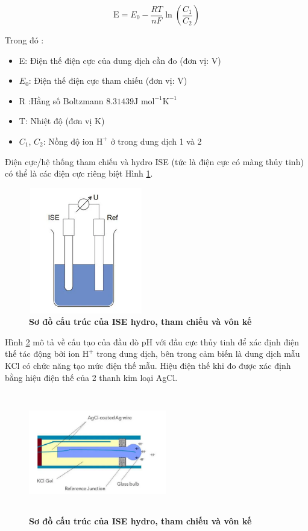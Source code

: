\documentclass{article} %
\begin{document}
	\begin{equation}
		\mathrm{E}=E_0-\frac{R T}{n F} \ln \left(\frac{C_1}{C_2}\right)     
	\end{equation}
	
	
	Trong đó :
	\begin{itemize}
		\item E: Điện thế điện cực của dung dịch cần đo (đơn vị: V)
		\item $E_0$: Điện thế điện cực tham chiếu (đơn vị: V)
		\item R :Hằng số Boltzmann $8.31439 \text{J mol}^{-1} \text{K}^{-1}$
		\item T: Nhiệt độ (đơn vị K)
		\item $C_1$, $C_2$: Nồng độ ion \( \text{H}^+ \) ở trong dung dịch 1 và 2
	\end{itemize}

Điện cực/hệ thống tham chiếu và hydro ISE (tức là điện cực có màng thủy tinh) có thể là các điện cực riêng biệt Hình \ref{ISE}.	

	\begin{figure}[!ht]
		\centering
		\includegraphics[width=5cm,height=5.5cm]{Images/ISE.png}
		\caption[Sơ đồ cấu trúc của ISE hydro, tham chiếu và vôn kế \cite{HeadPH}]{\bfseries \fontsize{12pt}{0pt}\selectfont Sơ đồ cấu trúc của ISE hydro, tham chiếu và vôn kế \cite{HeadPH}}
		\label{ISE}
	\end{figure}
	
	Hình \ref{PH} mô tả về cấu tạo của đầu dò pH với đầu cực thủy tinh để xác định điện thế tác động bởi ion \( \text{H}^+ \) trong dung dịch, bên trong cảm biến là dung dịch mẫu KCl có chức năng tạo mức điện thế mẫu. Hiệu điện thế khi đo được xác định bằng hiệu điện thế của 2 thanh kim loại AgCl.
	
	\begin{figure}[!ht]
		\centering
		\includegraphics[width=6cm,height=5.3cm]{Images/PHhead.png}
		\caption[Sơ đồ cấu trúc của ISE hydro, tham chiếu và vôn kế \cite{HeadPH}]{\bfseries \fontsize{12pt}{0pt}\selectfont Sơ đồ cấu trúc của ISE hydro, tham chiếu và vôn kế\cite{HeadPH}}
		\label{PH}
	\end{figure}
\end{document}
